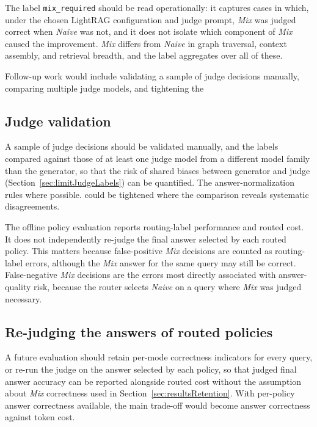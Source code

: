 \documentclass[english, bibtex]{kththesis}               %
\numberwithin{listing}{chapter}
\providecommand{\DIFaddtex}[1]{{\protect\color{blue} \sf #1}} %
\providecommand{\DIFdeltex}[1]{{\protect\color{red} \scriptsize #1}} %
\providecommand{\DIFaddbegin}{} %
\providecommand{\DIFaddend}{} %
\providecommand{\DIFdelbegin}{} %
\providecommand{\DIFdelend}{} %
\providecommand{\DIFadd}[1]{\texorpdfstring{\DIFaddtex{#1}}{#1}} %
\providecommand{\DIFdel}[1]{\texorpdfstring{\DIFdeltex{#1}}{}} %
\begin{document}
\DIFdel{The label \texttt{mix\_required} should be read operationally: it captures cases in which, under the chosen LightRAG configuration and judge prompt, \emph{Mix} was judged correct when \emph{Naive} was not, and it does not isolate which component of \emph{Mix} caused the improvement. \emph{Mix} differs from \emph{Naive} in graph traversal, context assembly, and retrieval breadth, and the label aggregates over all of these.
}%

\DIFdel{Follow-up work would include validating a sample of judge decisions manually, comparing multiple judge models, and tightening the }\DIFdelend \DIFaddbegin \subsection{Judge validation} \DIFadd{A sample of judge decisions should be validated manually, and the labels compared against those of at least one judge model from a different model family than the generator, so that the risk of shared biases between generator and judge (Section~\ref{sec:limitJudgeLabels}) can be quantified. The }\DIFaddend answer-normalization rules \DIFdelbegin \DIFdel{where possible.
}\DIFdelend \DIFaddbegin \DIFadd{could be tightened where the comparison reveals systematic disagreements.
}\DIFaddend 

\DIFdelbegin %

\DIFdel{The offline policy evaluation reports routing-label performance and routed cost. It does not independently re-judge the final answer selected by each routed policy.
This matters because false-positive \emph{Mix} decisions are counted as routing-label errors, although the \emph{Mix} answer for the same query may still be correct. False-negative \emph{Mix} decisions are the errors most directly associated with answer-quality risk, because the router selects \emph{Naive} on a query where \emph{Mix} was judged necessary.
}%

\DIFdelend \DIFaddbegin \subsection{Re-judging the answers of routed policies} \DIFaddend A future evaluation should retain per-mode correctness indicators for every query, or re-run the judge on the answer selected by each policy, so that judged final answer accuracy can be reported alongside routed cost \DIFaddbegin \DIFadd{without the assumption about \emph{Mix} correctness used in Section~\ref{sec:resultsRetention}}\DIFaddend . With per-policy answer correctness available, the main trade-off would become answer correctness against token cost.
\end{document}
